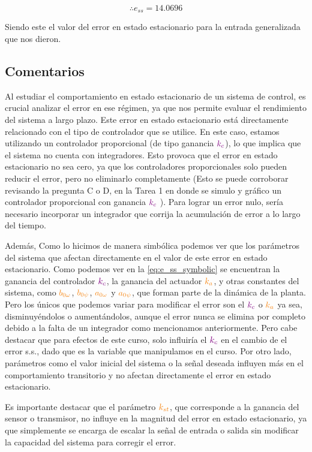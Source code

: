 \[
\boxed{\therefore e_{ss} = 14.0696}
\]

Siendo este el valor del error en estado estacionario para la entrada generalizada que nos dieron.

\FloatBarrier
\subsection{Comentarios}

Al estudiar el comportamiento en estado estacionario de un sistema de control, es crucial analizar el error en ese régimen, ya que nos permite evaluar el rendimiento del sistema a largo plazo. Este error en estado estacionario está directamente relacionado con el tipo de controlador que se utilice. En este caso, estamos utilizando un controlador proporcional (de tipo ganancia \(\mathbin{\color{violet}k_{c}}\)), lo que implica que el sistema no cuenta con integradores. Esto provoca que el error en estado estacionario no sea cero, ya que los controladores proporcionales solo pueden reducir el error, pero no eliminarlo completamente (Esto se puede corroborar revisando la pregunta C o D, en la Tarea 1 en donde se simulo y gráfico un controlador proporcional con ganancia \(\mathbin{\color{violet}k_{c}} \) ). Para lograr un error nulo, sería necesario incorporar un integrador que corrija la acumulación de error a lo largo del tiempo.

Además, Como lo hicimos de manera simbólica podemos ver que los parámetros del sistema que afectan directamente en el valor de este error en estado estacionario. Como podemos ver en la \eqref{eq:e_ss_symbolic} se encuentran la ganancia del controlador \(\mathbin{\color{violet}k_{c}}\), la ganancia del actuador \(\nara{k_a}\), y otras constantes del sistema, como \(\nara{b_{0\omega}}\), \(\nara{b_{0\psi}}\), \(\nara{a_{0\omega}}\) y \(\nara{a_{0\psi}}\), que forman parte de la dinámica de la planta. Pero los únicos que podemos variar para modificar el error son el \(\mathbin{\color{violet}k_{c}}\) o \(\nara{k_a}\) ya sea, disminuyéndolos o aumentándolos, aunque el error nunca se elimina por completo debido a la falta de un integrador como mencionamos anteriormente. Pero cabe destacar que para efectos de este curso, solo influiría el \(\mathbin{\color{violet}k_{c}}\) en el cambio de el error s.s., dado que es la variable que manipulamos en el curso. Por otro lado, parámetros como el valor inicial del sistema o la señal deseada influyen más en el comportamiento transitorio y no afectan directamente el error en estado estacionario.

Es importante destacar que el parámetro \(\nara{k_{st}}\), que corresponde a la ganancia del sensor o transmisor, no influye en la magnitud del error en estado estacionario, ya que simplemente se encarga de escalar la señal de entrada o salida sin modificar la capacidad del sistema para corregir el error.

